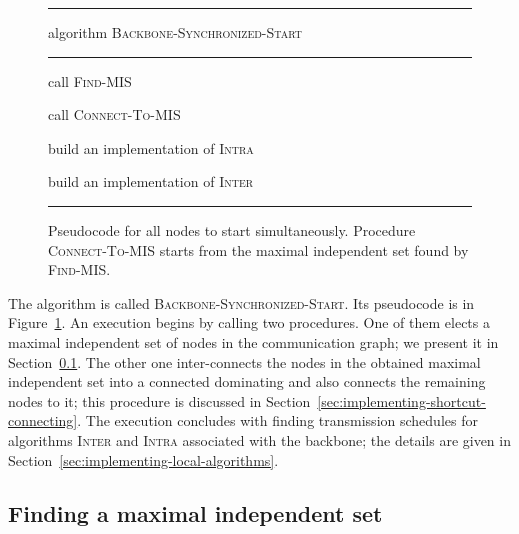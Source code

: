 \documentclass[11pt]{article}
\newcommand{\FF}{\vspace*{\medskipamount}}
\begin{document}
\begin{figure}[t]
\hrule

\FF

\textsf{algorithm} \textsc{Backbone-Synchronized-Start} 

\FF

\hrule

\FF

\begin{description}[nosep]
\item[\sf stage 1:] call \textsc{Find-MIS}

\item[\sf stage 2:]  call \textsc{Connect-To-MIS} 

\item[\sf stage 3:]  build an implementation of \textsc{Intra}

\item[\sf stage 4:]  build an implementation of \textsc{Inter}
\end{description}

\FF

\hrule

\caption{\label{alg:Backbone-Synchronized-Start}
Pseudocode for all nodes to start simultaneously.
Procedure \textsc{Connect-To-MIS} starts from the maximal independent set found by \textsc{Find-MIS}.}
\end{figure}

The algorithm is called \textsc{Backbone-Synchronized-Start}.
Its pseudocode  is  in Figure~\ref{alg:Backbone-Synchronized-Start}. 
An execution begins by calling two procedures.
One of them elects a maximal independent set  of nodes in the communication graph; we present it in Section~\ref{sec:finding-maximal-independent}.
The other one inter-connects the nodes in the obtained maximal independent set into a connected dominating and also connects the remaining nodes to it; this procedure is discussed in Section~\ref{sec:implementing-shortcut-connecting}.
The execution concludes with finding transmission schedules for algorithms \textsc{Inter} and \textsc{Intra} associated with the backbone; the details are given in Section~\ref{sec:implementing-local-algorithms}.




\subsection{Finding a maximal independent set}

\label{sec:finding-maximal-independent}
\end{document}
